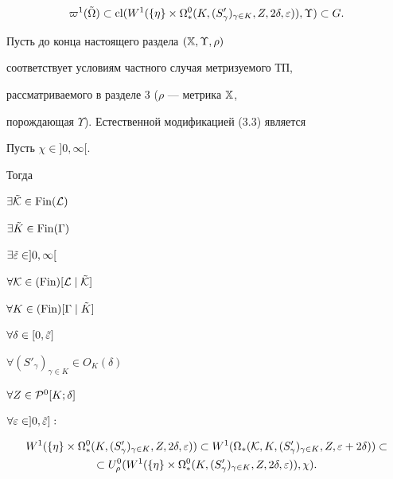 %


$$


\varpi^1(\tilde\Omega) \subset \cl(W^1(\{\eta\} \times \Omega_*^0(K,


(S'_\gamma)_{\gamma \in K}, Z, 2\delta, \var)), \Upsilon) \subset G.


$$


%


Пусть до конца настоящего раздела $({\Bbb X}, \Upsilon, \rho)$


соответствует условиям частного случая метризуемого ТП,


рассматриваемого в разделе 3 ($\rho$ --- метрика ${\Bbb X}$,


порождающая $\Upsilon$). Естественной модификацией (3.3) является





\begin{thms} Пусть $\chi \in ]0,\infty[$.


Тогда


$\exists\tilde {\cal K} \in \operatorname{Fin}({\cal L})$


$\exists\tilde K \in \operatorname{Fin}(\Gamma)$


$\exists\tilde{\varepsilon} \in ]0,\infty[$


$\forall {\cal K} \in (\operatorname{Fin})[{\cal L}\mid \tilde{\cal K}]$


$\forall K \in (\operatorname{Fin})[\Gamma\mid\tilde K]$


$\forall\delta \in [0,\tilde{\varepsilon}]$


$\forall (S'_\gamma)_{\gamma \in K} \in O_K(\delta)$


$\forall Z \in {\cal P}^0[K; \delta]$


$\forall\varepsilon \in ]0, \tilde{\varepsilon}]:$


%


\begin{multline}


W^1(\{\eta\} \times \Omega_*^0(K,


(S'_\gamma)_{\gamma \in K}, Z, 2\delta, \var)) \subset 


W^1(\Omega_*({\cal K}, K, (S'_\gamma)_{\gamma \in K}, Z, \var +


2\delta)) \subset \\


%


\subset U^0_\rho(W^1(\{\eta\} \times \Omega_*^0(K,


(S'_\gamma)_{\gamma \in K}, Z, 2\delta, \var)), \chi).


\end{multline}


\end{thms}





